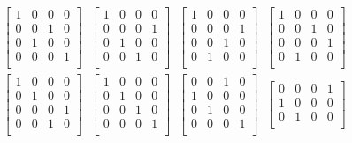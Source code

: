 \documentclass[]{article}
\begin{document}
\begin{equation}
\begin{aligned}\begin{bmatrix}
1 &0 &0 &0\\
0 &0 &1 &0\\
0 &1 &0 &0\\
0 &0 &0 &1\\
 \end{bmatrix}\;\;\begin{bmatrix}
1 &0 &0 &0\\
0 &0 &0 &1\\
0 &1 &0 &0\\
0 &0 &1 &0\\
 \end{bmatrix}\;\;\begin{bmatrix}
1 &0 &0 &0\\
0 &0 &0 &1\\
0 &0 &1 &0\\
0 &1 &0 &0\\
 \end{bmatrix}\;\;\begin{bmatrix}
1 &0 &0 &0\\
0 &0 &1 &0\\
0 &0 &0 &1\\
0 &1 &0 &0\\
 \end{bmatrix}\;\;\\\begin{bmatrix}
1 &0 &0 &0\\
0 &1 &0 &0\\
0 &0 &0 &1\\
0 &0 &1 &0\\
 \end{bmatrix}\;\;\begin{bmatrix}
1 &0 &0 &0\\
0 &1 &0 &0\\
0 &0 &1 &0\\
0 &0 &0 &1\\
 \end{bmatrix}\;\;\begin{bmatrix}
0 &0 &1 &0\\
1 &0 &0 &0\\
0 &1 &0 &0\\
0 &0 &0 &1\\
 \end{bmatrix}\;\;\begin{bmatrix}
0 &0 &0 &1\\
1 &0 &0 &0\\
0 &1 &0 &0\\

\end{bmatrix}
\end{aligned}
\end{equation}
\end{document}
